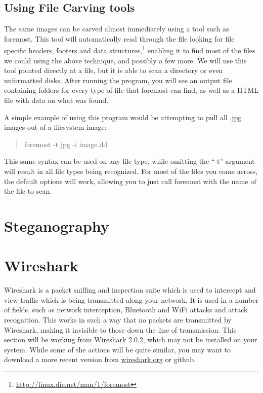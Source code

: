 \documentclass[a4paper,11pt]{report}
\begin{document}
		\subsection{Using File Carving tools}
			The same images can be carved almost immediately using a tool such as foremost. 
			This tool will automatically read through the file looking for file specific headers, footers and data structures,\footnote{\url{http://linux.die.net/man/1/foremost}}
			enabling it to find most of the files we could using the above technique, and possibly a few more. 
			We will use this tool pointed directly at a file, but it is able to scan a directory or even unformatted disks. 
			After running the program, you will see an output file containing folders for every type of file that foremost can find, as well as a HTML file with data on what was found. 

			A simple example of using this program would be attempting to pull all .jpg images out of a filesystem image:
			\begin{quote}
				foremost -t jpg -i image.dd
			\end{quote}
			This same syntax can be used on any file type, while omitting the ``-t'' argument will result in all file types being recognized. 
			For most of the files you come across, the default options will work, allowing you to just call foremost with the name of the file to scan. 


	\section{Steganography}
	\section{Wireshark}
		Wireshark is a packet sniffing and inspection suite which is used to intercept and view traffic which is being transmitted along your network.\cite{WSUG} 
		It is used in a number of fields, such as network interception, Bluetooth and WiFi attacks and attack recognition. 
		This works in such a way that no packets are transmitted by Wireshark, making it invisible to those down the line of transmission. 
		This section will be working from Wireshark 2.0.2, which may not be installed on your system. 
		While some of the actions will be quite similar, you may want to download a more recent version from \url{wireshark.org} or github.
\end{document}
